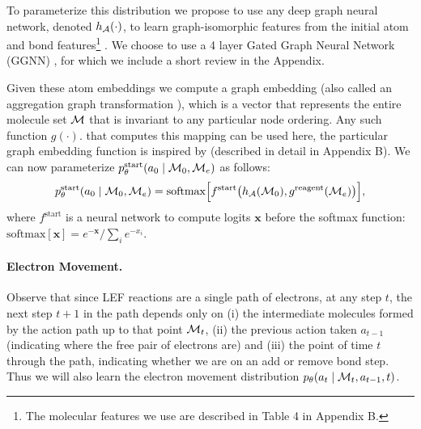 To parameterize this distribution we propose to use any deep graph neural network, denoted $h_{{\mathcal{A}}}(\cdot)$, to learn graph-isomorphic features from the initial atom and bond features\footnote{The molecular features we use are described in Table 4 in Appendix B.} \citep{duvenaud2015convolutional,kipf2016semi,li2016gated,gilmer2017neural}. We choose to use a 4 layer Gated Graph Neural Network (GGNN) \citep{li2016gated}, for which we include a short review in the Appendix. %

Given these atom embeddings we compute a graph embedding \citet[\S B.1]{li2018learning} (also called an aggregation graph transformation \citep[\S3]{Johnson2017-pd}), which is a vector that represents the entire molecule set ${\mathcal{M}}$ that is invariant to any particular node ordering. Any such function $g(\cdot)$. that computes this mapping can be used here, the particular graph embedding function is inspired by \cite{li2018learning} (described in detail in Appendix B). We can now parameterize $p_\theta^{\mathrm{start}}(a_0 \mid {\mathcal{M}}_0, {\mathcal{M}}_e)$ as follows:
\begin{align}
p_\theta^{\mathrm{start}}(a_0 \mid  {\mathcal{M}}_0, {\mathcal{M}}_e) = \mbox{softmax}\Big[f^{\mathrm{start}}\big( h_{{\mathcal{A}}}({\mathcal{M}}_0), g^{\mathrm{reagent}}({\mathcal{M}}_e)\big)\Big], 
\end{align}
where $f^{\mathrm{start}}$ is a neural network to compute logits $\mathbf{x}$ before the softmax function: $\mbox{softmax}[\mathbf{x}] = e^{-\mathbf{x}}/\sum_{i} e^{-x_i}$. %



\paragraph{Electron Movement.}
Observe that since LEF reactions are a single path of electrons, at any step $t$, the next step $t+1$ in the path depends only on (i) the intermediate molecules formed by the action path up to that point ${\mathcal{M}}_t$, (ii) the previous action taken $a_{t-1}$ (indicating where the free pair of electrons are) and (iii) the point of time $t$ through the path, indicating whether we are on an add or remove bond step. Thus we will also learn the electron movement distribution $p_\theta(a_t \mid {\mathcal{M}}_{t}, a_{t-1}, t)$.


